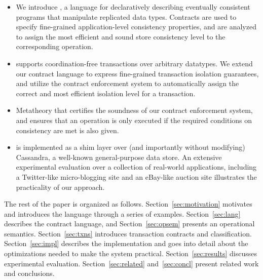 \begin{itemize}

\item We introduce \name, a language for declaratively describing eventually
  consistent programs that manipulate replicated data types. Contracts are
  used to specify fine-grained application-level consistency properties, and
  are analyzed to assign the most efficient and sound store consistency
  level to the corresponding operation.

\item \name supports coordination-free transactions over arbitrary
  datatypes.  We extend our contract language to express fine-grained
  transaction isolation guarantees, and utilize the contract enforcement
  system to automatically assign the correct and most efficient isolation
  level for a transaction.

\item Metatheory that certifies the soundness of our contract enforcement
  system, and ensures that an operation is only executed if the required
  conditions on consistency are met is also given.

\item \name is implemented as a shim layer over (and importantly without
  modifying) Cassandra, a well-known general-purpose data store.  An
  extensive experimental evaluation over a collection of real-world
  applications, including a Twitter-like micro-blogging site and an
  eBay-like auction site illustrates the practicality of our approach.

\end{itemize}

The rest of the paper is organized as follows. Section~\ref{sec:motivation}
motivates \name and introduces the language through a series of examples.
Section~\ref{sec:lang} describes the contract language, and
Section~\ref{sec:opsem} presents an operational semantics.
Section~\ref{sec:txns} introduces transaction contracts and
classification. Section~\ref{sec:impl} describes the implementation and goes
into detail about the optimizations needed to make the system practical.
Section~\ref{sec:results} discusses experimental evaluation.
Section~\ref{sec:related} and~\ref{sec:concl} present related work and
conclusions.

